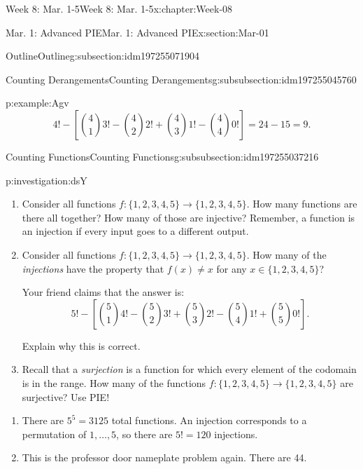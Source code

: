 \documentclass[oneside,10pt,]{book}
\numberwithin{equation}{section}
\begin{document}
\begin{chapterptx}{Week 8: Mar. 1-5}{}{Week 8: Mar. 1-5}{}{}{x:chapter:Week-08}
\begin{sectionptx}{Mar. 1: Advanced PIE}{}{Mar. 1: Advanced PIE}{}{}{x:section:Mar-01}
\begin{subsectionptx}{Outline}{}{Outline}{}{}{g:subsection:idm197255071904}
\begin{subsubsectionptx}{Counting Derangements}{}{Counting Derangements}{}{}{g:subsubsection:idm197255045760}
\begin{example}{}{p:example:Agv}
\begin{equation*}
4! - \left[{4 \choose 1}3! - {4 \choose 2}2! + {4 \choose 3} 1! - {4 \choose 4}0!\right] = 24 - 15 = 9\text{.}
\end{equation*}
%
\end{example}
\end{subsubsectionptx}
%
%
\typeout{************************************************}
\typeout{************************************************}
%
\begin{subsubsectionptx}{Counting Functions}{}{Counting Functions}{}{}{g:subsubsection:idm197255037216}
%
\begin{investigation}{}{p:investigation:dsY}%
%
\begin{enumerate}
\item{}Consider all functions \(f: \{1,2,3,4,5\} \to \{1,2,3,4,5\}\). How many functions are there all together? How many of those are injective? Remember, a function is an injection if every input goes to a different output.%
\item{}Consider all functions \(f: \{1,2,3,4,5\} \to \{1,2,3,4,5\}\). How many of the \emph{injections} have the property that \(f(x) \ne x\) for any \(x \in \{1,2,3,4,5\}\)? %
\par
Your friend claims that the answer is:%
\begin{equation*}
5! - \left[ {5\choose 1}4! - {5 \choose 2}3! + {5\choose 3}2! - {5 \choose 4}1! + {5\choose 5}0! \right]\text{.}
\end{equation*}
%
\par
Explain why this is correct.%
\item{}Recall that a \emph{surjection}  is a function for which every element of the codomain is in the range. How many of the functions \(f: \{1,2,3,4,5\} \to \{1,2,3,4,5\}\) are surjective? Use PIE!%
\end{enumerate}
%
\par\smallskip%
\noindent\hypertarget{g:solution:idm197255020688}{}%
\begin{enumerate}
\item{}There are \(5^5 = 3125\) total functions. An injection corresponds to a permutation of \(1, \ldots, 5\), so there are \(5! = 120\) injections.%
\item{}This is the professor door nameplate problem again. There are 44.%

\end{enumerate}
\end{investigation}
\end{subsubsectionptx}
\end{subsectionptx}
\end{sectionptx}
\end{chapterptx}
\end{document}
